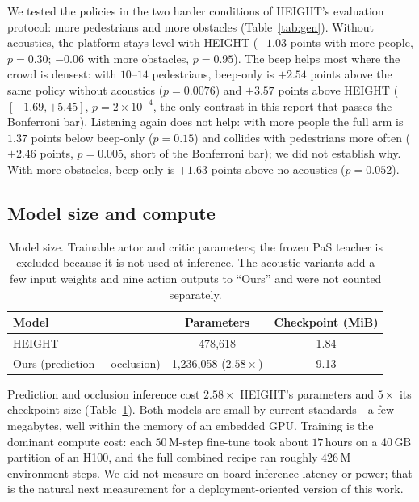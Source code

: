 \documentclass[conference]{IEEEtran}
\begin{document}
We tested the policies in the two harder conditions of HEIGHT's evaluation protocol: more
pedestrians and more obstacles (Table~\ref{tab:gen}). Without acoustics, the platform stays
level with HEIGHT ($+1.03$ points with more people, $p=0.30$; $-0.06$ with more obstacles,
$p=0.95$). The beep helps most where the crowd is densest: with $10$--$14$
pedestrians, beep-only is $+2.54$ points above the same policy without acoustics ($p=0.0076$)
and $+3.57$ points above HEIGHT ($[+1.69,+5.45]$, $p=2\times10^{-4}$, the only contrast in this
report that passes the Bonferroni bar). Listening again does not help: with more people the full
arm is $1.37$ points below beep-only ($p=0.15$) and collides with pedestrians more often
($+2.46$ points, $p=0.005$, short of the Bonferroni bar); we did not establish why. With more
obstacles, beep-only is $+1.63$ points above no acoustics ($p=0.052$).

\subsection{Model size and compute}
\begin{table}[t]
\caption{Model size. Trainable actor and critic parameters; the frozen PaS teacher is excluded
because it is not used at inference. The acoustic variants add a few input weights and nine
action outputs to ``Ours'' and were not counted separately.}
\label{tab:size}
\centering
\setlength{\tabcolsep}{4pt}
\begin{tabular}{lcc}
\toprule
Model & Parameters & Checkpoint (MiB) \\
\midrule
HEIGHT & 478{,}618 & 1.84 \\
Ours (prediction + occlusion) & 1{,}236{,}058 ($2.58\times$) & 9.13 \\
\bottomrule
\end{tabular}
\end{table}

Prediction and occlusion inference cost $2.58\times$ HEIGHT's parameters and $5\times$ its
checkpoint size (Table~\ref{tab:size}). Both models are small by current standards---a few
megabytes, well within the memory of an embedded GPU. Training is the dominant compute cost: each $50$\,M-step fine-tune took about
$17$\,hours on a 40\,GB partition of an H100, and the full combined recipe ran roughly $426$\,M
environment steps. We did
not measure on-board inference latency or power; that is the natural next measurement for a
deployment-oriented version of this work.

\end{document}

